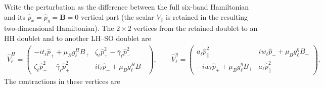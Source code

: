 Write the perturbation as the difference between the full six-band
Hamiltonian and its $ \hat{p}_ x= \hat{p}_ y=\bm B=0$ vertical part (the scalar
$V_\parallel$ is retained in the resulting two-dimensional Hamiltonian).
The $2\times2$ vertices from the retained doublet to an HH doublet
and to another LH--SO doublet are
\begin{align}
 \hat V_\ell^H=
 \begin{pmatrix}
 -it_\ell  \hat{p}_ ++\mu_B g_\ell^H B_+&
 \zeta_\ell  \hat{p}_ +^2-\bar\gamma_\ell  \hat{p}_ -^2\\
 \zeta_\ell  \hat{p}_ -^2-\bar\gamma_\ell  \hat{p}_ +^2&
 it_\ell  \hat{p}_ -+\mu_B g_\ell^H B_-
 \end{pmatrix},
 \qquad
 \hat V_\ell^\eta=
 \begin{pmatrix}
 a_\ell\hat p_\parallel^2&iw_\ell  \hat{p}_ -+\mu_B g_\ell^\eta B_-\\
 -iw_\ell  \hat{p}_ ++\mu_B g_\ell^\eta B_+&a_\ell\hat p_\parallel^2
 \end{pmatrix}.
 \label{eq:swt6-Veta}
\end{align}
The contractions in these vertices are
